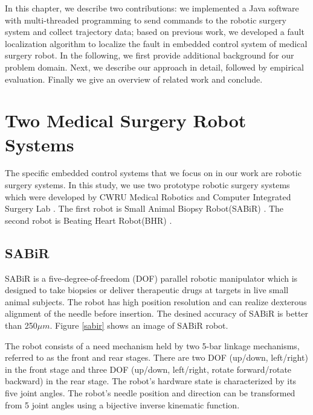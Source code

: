 In this chapter, we describe two contributions: we implemented a Java software with multi-threaded programming to send commands to the robotic surgery system and collect trajectory data; based on previous work, we developed a fault localization algorithm to localize the fault in embedded control system of medical surgery robot. In the following, we first provide additional background for our problem domain. Next, we describe our approach in detail, followed by empirical evaluation. Finally we give an overview of related work and conclude.

\section{Two Medical Surgery Robot Systems }\label{secrobot}
The specific embedded control systems that we focus on in our work are robotic surgery systems. In this study, we use two prototype robotic surgery systems which were developed by CWRU Medical Robotics and Computer Integrated Surgery Lab \cite{MeRCIS}. The first robot is Small Animal Biopsy Robot(SABiR) \cite{bebek2008design}. The second robot is Beating Heart Robot(BHR) \cite{bebek2007whisker, bebek2006model}.

\subsection {SABiR}
SABiR is a five-degree-of-freedom (DOF) parallel robotic manipulator which is designed to take biopsies or deliver therapeutic drugs at targets in live small animal subjects. The robot has high position resolution and can realize dexterous alignment of  the needle before insertion. The desined accuracy of SABiR is better than 250${\mu}m$. Figure \ref{sabir} shows an image of SABiR robot. 

The robot consists of a need mechanism held by two 5-bar linkage mechanisms, referred to as the front and rear stages. There are two DOF (up/down, left/right) in the front stage and three DOF (up/down, left/right, rotate forward/rotate backward) in the rear stage. The robot’s hardware state is characterized by its five joint angles. The robot’s needle position and direction can be transformed from 5 joint angles using a bijective inverse kinematic function.

